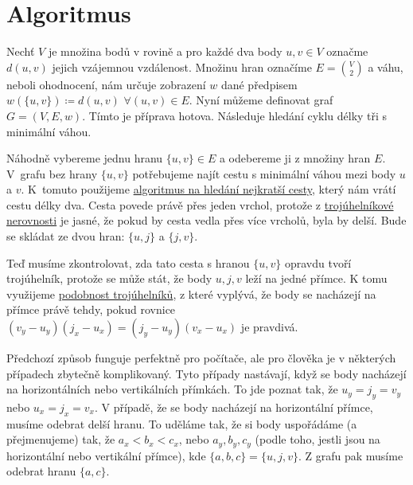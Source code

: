 \section{Algoritmus}
\label{sec:algoritmus}

Nechť $V$ je množina bodů v rovině a pro každé dva body $u, v \in V$ označme $d(u, v)$ jejich vzájemnou vzdálenost. Množinu hran označíme $E = \binom{V}{2}$ a váhu, neboli ohodnocení, nám určuje zobrazení $w$ dané předpisem $w(\{u, v\}) \coloneqq d(u, v)$ $\forall (u, v) \in E$. Nyní můžeme definovat graf $G = (V, E, w)$.
Tímto je příprava hotova. Následuje hledání cyklu délky tři s minimální váhou.



Náhodně vybereme jednu hranu $\{u, v\} \in E$ a odebereme ji z množiny hran $E$. V~grafu bez hrany $\{u, v\}$ potřebujeme najít cestu s minimální váhou mezi body $u$ a  $v$. K~tomuto použijeme \hyperref[sec:adaptace]{algoritmus na hledání nejkratší cesty}, který nám vrátí cestu délky dva. Cesta povede právě přes jeden vrchol, protože z \hyperref[tvrzeni:trojuhelnikova_nerovnost]{trojúhelníkové nerovnosti} je jasné, že pokud by cesta vedla přes více vrcholů, byla by delší. Bude se skládat ze dvou hran: $\{u, j\}$ a $\{j, v\}$.

Teď musíme zkontrolovat, zda tato cesta s hranou $\{u, v\}$ opravdu tvoří trojúhelník, protože se může  stát, že body $u, j, v$ leží na jedné přímce. K tomu využijeme \hyperref[sec:podobnost]{podobnost trojúhelníků}, z které vyplývá, že body se nacházejí na přímce právě tehdy, pokud rovnice $(v_y - u_y)(j_x - u_x) = (j_y - u_y)(v_x - u_x)$ je pravdivá. 

\begin{poznamka}
Předchozí způsob funguje perfektně pro počítače, ale pro člověka je v některých případech zbytečně komplikovaný. Tyto případy nastávají, když se body nacházejí na horizontálních nebo vertikálních přímkách. To jde poznat tak, že $u_y = j_y = v_y$ nebo $u_x = j_x = v_x$.
V případě, že se body nacházejí na horizontální přímce, musíme odebrat delší hranu. To uděláme tak, že si body uspořádáme (a přejmenujeme) tak, že $a_x<b_x<c_x$, nebo $a_y, b_y, c_y$ (podle toho, jestli jsou na horizontální nebo vertikální přímce), kde $\{a, b, c\} = \{u, j, v\}$. Z grafu pak musíme odebrat hranu $\{a, c\}$.
\end{poznamka}


